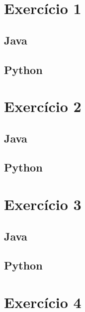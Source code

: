 \documentclass[a4paper]{report}
\begin{document}
\renewcommand*{\glossaryname}{Glossário}

\printglossaries



\appendix
\chapter{Exercício 1}
\section{Java}
\label{java.1}
\footnotesize


\section{Python}
\label{python.1}


\chapter{Exercício 2}
\section{Java}
\label{java.2}


\section{Python}
\label{python.2}


\chapter{Exercício 3}
\section{Java}
\label{java.3}


\section{Python}
\label{python.3}


\chapter{Exercício 4}
\end{document}
